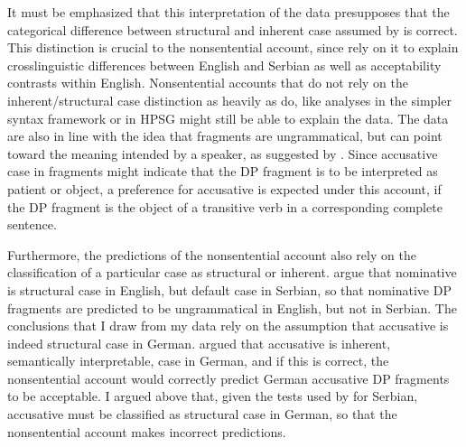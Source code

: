 It must be emphasized that this interpretation of the data presupposes that the categorical difference between structural and inherent case assumed by \citet{barton.progovac2005} is correct. This distinction is crucial to the nonsentential account, since \citet{barton.progovac2005} rely on it to explain crosslinguistic differences between English and Serbian as well as acceptability contrasts within English. Nonsentential accounts that do not rely on the inherent/structural case distinction as heavily as \citet{barton.progovac2005} do, like analyses in the simpler syntax framework \citep{culicover.jackendoff2005} or in HPSG \citep{ginzburg.sag2000, fernandez.ginzburg2002} might still be able to explain the data. The data are also in line with the idea that fragments are ungrammatical, but can point toward the meaning intended by a speaker, as suggested by \citet{bergen.goodman2015}. Since accusative case in fragments might indicate that the DP fragment is to be interpreted as patient or object, a preference for accusative is expected under this account, if the DP fragment is the object of a transitive verb in a corresponding complete sentence. 

Furthermore, the predictions of the nonsentential account also rely on the classification of a particular case as structural or inherent. \citet{barton.progovac2005} argue that nominative is structural case in English, but default case in Serbian, so that nominative DP fragments are predicted to be ungrammatical in English, but not in Serbian. The conclusions that I draw from my data rely on the assumption that accusative is indeed structural case in German. \citet{progovac.etal2006} argued that accusative is inherent, semantically interpretable, case in German, and if this is correct, the nonsentential account would correctly predict German accusative DP fragments to be acceptable. I argued above that, given the tests used by \citet{progovac.etal2006} for Serbian, accusative must be classified as structural case in German, so that the nonsentential account makes incorrect predictions.\largerpage[-1]

